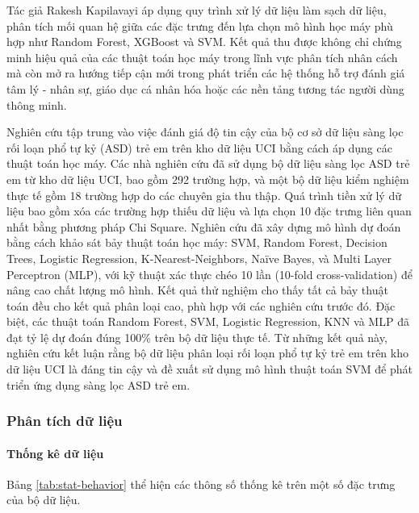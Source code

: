     Tác giả Rakesh Kapilavayi \cite{kapilavayi} áp dụng quy trình xử lý dữ liệu làm sạch dữ liệu, phân tích mối quan hệ giữa các đặc trưng đến lựa chọn mô hình học máy phù hợp như Random Forest, XGBoost và SVM. Kết quả thu được không chỉ chứng minh hiệu quả của các thuật toán học máy trong lĩnh vực phân tích nhân cách mà còn mở ra hướng tiếp cận mới trong phát triển các hệ thống hỗ trợ đánh giá tâm lý - nhân sự, giáo dục cá nhân hóa hoặc các nền tảng tương tác người dùng thông minh.

    Nghiên cứu \cite{article_tab_3}tập trung vào việc đánh giá độ tin cậy của bộ cơ sở dữ liệu sàng lọc rối loạn phổ tự kỷ (ASD) trẻ em trên kho dữ liệu UCI bằng cách áp dụng các thuật toán học máy. Các nhà nghiên cứu đã sử dụng bộ dữ liệu sàng lọc ASD trẻ em từ kho dữ liệu UCI, bao gồm 292 trường hợp, và một bộ dữ liệu kiểm nghiệm thực tế gồm 18 trường hợp do các chuyên gia thu thập. Quá trình tiền xử lý dữ liệu bao gồm xóa các trường hợp thiếu dữ liệu và lựa chọn 10 đặc trưng liên quan nhất bằng phương pháp Chi Square. Nghiên cứu đã xây dựng mô hình dự đoán bằng cách khảo sát bảy thuật toán học máy: SVM, Random Forest, Decision Trees, Logistic Regression, K-Nearest-Neighbors, Naïve Bayes, và Multi Layer Perceptron (MLP), với kỹ thuật xác thực chéo 10 lần (10-fold cross-validation) để nâng cao chất lượng mô hình. Kết quả thử nghiệm cho thấy tất cả bảy thuật toán đều cho kết quả phân loại cao, phù hợp với các nghiên cứu trước đó. Đặc biệt, các thuật toán Random Forest, SVM, Logistic Regression, KNN và MLP đã đạt tỷ lệ dự đoán đúng 100\% trên bộ dữ liệu thực tế. Từ những kết quả này, nghiên cứu kết luận rằng bộ dữ liệu phân loại rối loạn phổ tự kỷ trẻ em trên kho dữ liệu UCI là đáng tin cậy và đề xuất sử dụng mô hình thuật toán SVM để phát triển ứng dụng sàng lọc ASD trẻ em.

\subsubsection{Phân tích dữ liệu}

    \paragraph{Thống kê dữ liệu}
        \leavevmode

     Bảng \ref{tab:stat-behavior} thể hiện các thông số thống kê trên một số đặc trưng của bộ dữ liệu.
     

